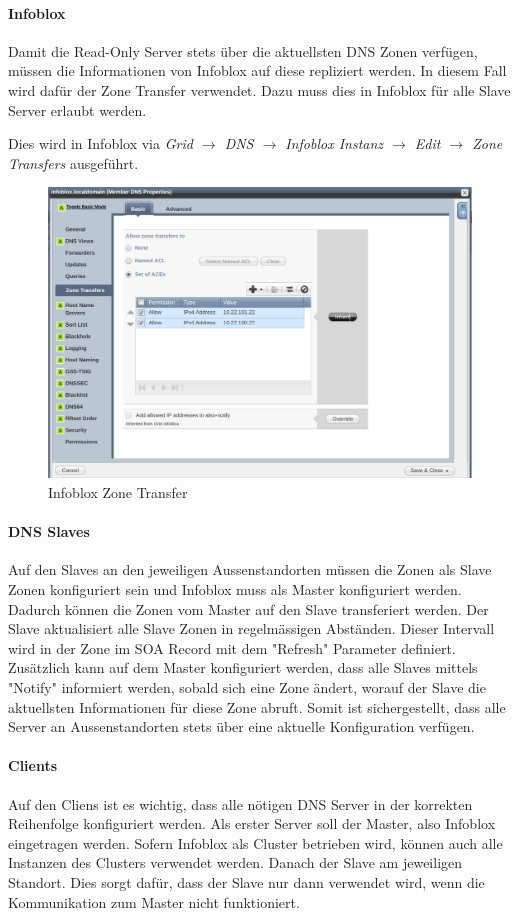 \paragraph{Infoblox}

Damit die Read-Only Server stets über die aktuellsten DNS Zonen verfügen, müssen die Informationen von Infoblox auf diese repliziert werden. In diesem Fall wird dafür der Zone Transfer verwendet. Dazu muss dies in Infoblox für alle Slave Server erlaubt werden. 

Dies wird in Infoblox via \textit{Grid $\rightarrow$ DNS $\rightarrow$ Infoblox Instanz $\rightarrow$ Edit $\rightarrow$ Zone Transfers} ausgeführt.

\begin{figure}[H]
	\centering
	\includegraphics[width=0.8\linewidth]{img/Absicherung/Infoblox_Zone_Transfer.png}
	\caption{Infoblox Zone Transfer}
	\label{fig:Infoblox Zone Transfer}
\end{figure}

\paragraph{DNS Slaves}

Auf den Slaves an den jeweiligen Aussenstandorten müssen die Zonen als Slave Zonen konfiguriert sein und Infoblox muss als Master konfiguriert werden. Dadurch können die Zonen vom Master auf den Slave transferiert werden. Der Slave aktualisiert alle Slave Zonen in regelmässigen Abständen. Dieser Intervall wird in der Zone im SOA Record mit dem "Refresh" Parameter definiert.
Zusätzlich kann auf dem Master konfiguriert werden, dass alle Slaves mittels "Notify" informiert werden, sobald sich eine Zone ändert, worauf der Slave die aktuellsten Informationen für diese Zone abruft. Somit ist sichergestellt, dass alle Server an Aussenstandorten stets über eine aktuelle Konfiguration verfügen.

\paragraph{Clients}

Auf den Cliens ist es wichtig, dass alle nötigen DNS Server in der korrekten Reihenfolge konfiguriert werden. Als erster Server soll der Master, also Infoblox eingetragen werden. Sofern Infoblox als Cluster betrieben wird, können auch alle Instanzen des Clusters verwendet werden. Danach der Slave am jeweiligen Standort. Dies sorgt dafür, dass der Slave nur dann verwendet wird, wenn die Kommunikation zum Master nicht funktioniert.